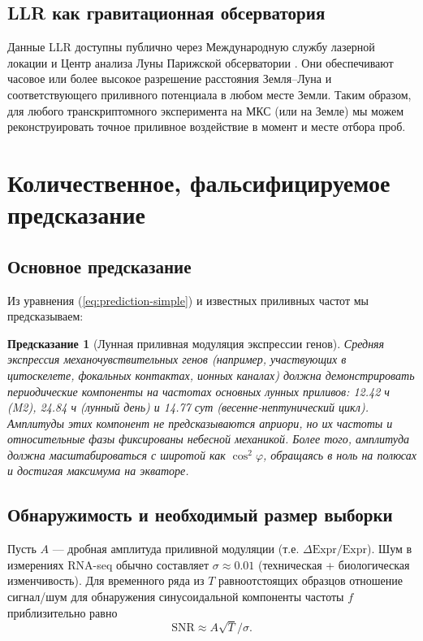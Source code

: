 \documentclass[12pt,a4paper]{article}
\newtheorem{prediction}[theorem]{Предсказание}
\theoremstyle{remark}
\begin{document}
	\subsection{LLR как гравитационная обсерватория}
	
	Данные LLR доступны публично через Международную службу лазерной локации \cite{ILRS} и Центр анализа Луны Парижской обсерватории \cite{LLR-POLAC}. Они обеспечивают часовое или более высокое разрешение расстояния Земля–Луна и соответствующего приливного потенциала в любом месте Земли. Таким образом, для любого транскриптомного эксперимента на МКС (или на Земле) мы можем реконструировать точное приливное воздействие в момент и месте отбора проб.
	
	\section{Количественное, фальсифицируемое предсказание}
	\label{sec:prediction}
	
	\subsection{Основное предсказание}
	
	Из уравнения (\ref{eq:prediction-simple}) и известных приливных частот мы предсказываем:
	
	\begin{prediction}[Лунная приливная модуляция экспрессии генов]
		Средняя экспрессия механочувствительных генов (например, участвующих в цитоскелете, фокальных контактах, ионных каналах) должна демонстрировать периодические компоненты на частотах основных лунных приливов: 12.42 ч (M2), 24.84 ч (лунный день) и 14.77 сут (весенне-нептунический цикл). Амплитуды этих компонент не предсказываются априори, но их частоты и относительные фазы фиксированы небесной механикой. Более того, амплитуда должна масштабироваться с широтой как \(\cos^2\varphi\), обращаясь в ноль на полюсах и достигая максимума на экваторе.
	\end{prediction}
	
	\subsection{Обнаружимость и необходимый размер выборки}
	
	Пусть \(A\) — дробная амплитуда приливной модуляции (т.е. \(\Delta\text{Expr}/\text{Expr}\)). Шум в измерениях RNA-seq обычно составляет \(\sigma \approx 0.01\) (техническая + биологическая изменчивость). Для временного ряда из \(T\) равноотстоящих образцов отношение сигнал/шум для обнаружения синусоидальной компоненты частоты \(f\) приблизительно равно
	\[
	\mathrm{SNR} \approx A \sqrt{T} / \sigma .
	\]
	
\end{document}
